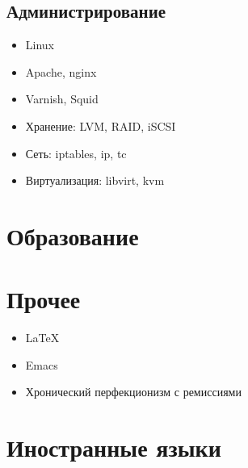 \documentclass[10pt,a4paper,sans]{moderncv}        %
\begin{document}
\subsection{Администрирование}

\begin{itemize}
\item Linux
\item Apache, nginx
\item Varnish, Squid
\item Хранение: LVM, RAID, iSCSI
\item Сеть: iptables, ip, tc
\item Виртуализация: libvirt, kvm
\end{itemize}

\section{Образование}


\section{Прочее}

\begin{itemize}
\item \LaTeX
\item Emacs
\item Хронический перфекционизм с ремиссиями
\end{itemize}

\section{Иностранные языки}


\nocite{*}

\end{document}

